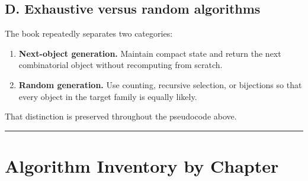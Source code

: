 \documentclass[11pt]{article}
\providecommand{\tightlist}{\setlength{\itemsep}{0pt}\setlength{\parskip}{0pt}}
\begin{document}
\subsection{D. Exhaustive versus random algorithms}\label{d.-exhaustive-versus-random-algorithms}

The book repeatedly separates two categories:

\begin{enumerate}
\def\labelenumi{\arabic{enumi}.}
\tightlist
\item
  \textbf{Next-object generation.} Maintain compact state and return the next combinatorial object without recomputing from scratch.
\item
  \textbf{Random generation.} Use counting, recursive selection, or bijections so that every object in the target family is equally likely.
\end{enumerate}

That distinction is preserved throughout the pseudocode above.

\begin{center}\rule{0.5\linewidth}{0.5pt}\end{center}

\section{Algorithm Inventory by Chapter}\label{algorithm-inventory-by-chapter}
\end{document}
